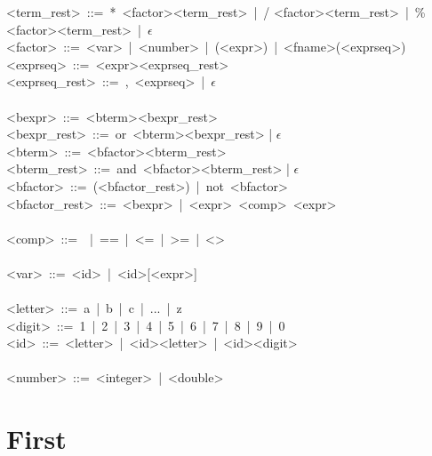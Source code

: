 \documentclass{article}
\begin{document}
<term\_rest>\ ::=\ *\ <factor><term\_rest>\ |\ / <factor><term\_rest>\ |\ \% <factor><term\_rest>\ |\ $\epsilon$\\
<factor>\ ::=\ <var>\ |\ <number>\ |\ (<expr>)\ |\ <fname>(<exprseq>)\\
<exprseq>\ ::=\ <expr><exprseq\_rest>\\
<exprseq\_rest>\ ::=\ ,\ <exprseq>\ |\ $\epsilon$\\
\\
<bexpr>\ ::=\ <bterm><bexpr\_rest>\\
<bexpr\_rest>\ ::=\ or\ <bterm><bexpr\_rest> | $\epsilon$ \\
<bterm>\ ::=\ <bfactor><bterm\_rest>\\
<bterm\_rest>\ ::=\ and\ <bfactor><bterm\_rest> | $\epsilon$\\
<bfactor>\ ::=\ (<bfactor\_rest>)\ |\ not\ <bfactor>\\
<bfactor\_rest>\ ::=\ <bexpr>\ |\ <expr>\ <comp>\ <expr>\\
\\
<comp>\ ::=\ < | >\ |\ ==\ |\ <=\ |\ >=\ |\ <>\\
\\
<var>\ ::=\ <id>\ |\ <id>[<expr>]\\
\\
<letter>\ ::=\ a\ |\ b\ |\ c\ |\ ...\ |\ z\\
<digit>\ ::=\ 1\ |\ 2\ |\ 3\ |\ 4\ |\ 5\ |\ 6\ |\ 7\ |\ 8\ |\ 9\ |\ 0\\
<id>\ ::=\ <letter>\ |\ <id><letter>\ |\ <id><digit>\\
\\
<number>\ ::=\ <integer>\ |\ <double>\\

\newpage
\noindent
\section*{First}
\end{document}
